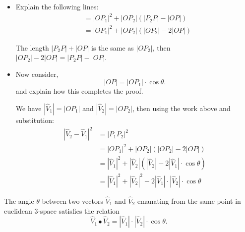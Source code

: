 \documentclass{ximera}
\begin{document}
\begin{problem}
\begin{itemize}
\item Explain the following lines:
\begin{align*}
&=|OP_{1}|^{2}+|OP_{2}| \left(|P_{2}P|-|OP|\right)\\
&=|OP_{1}|^{2}+|OP_{2}| \left(|OP_{2}| -2| OP| \right)
\end{align*}

\begin{freeResponse}
The length $|P_{2}P|+|OP|$ is the same as $|OP_{2}|$, then $|OP_{2}| - 2|OP| = |P_{2}P|-|OP|$.
\end{freeResponse}
\item Now consider,
\[
|OP| =|OP_{1}| \cdot\cos\theta.
\]
and explain how this completes the proof.

\begin{freeResponse}
We have $|\hat{V}_{1}| = |OP_{1}|$ and $|\hat{V}_{2}| = |OP_{2}|$, then using the work above and substitution:
\begin{align*} 
|\hat{V}_{2} - \hat{V}_{1}|^2 &= |P_{1}P_{2}|^{2}\\
&=|OP_{1}|^{2}+|OP_{2}| \left(|OP_{2}| -2| OP| \right)\\
&=|\hat{V}_{1}|^2 + |\hat{V}_{2}|\left(|\hat{V}_{2}| -2|\hat{V}_{1}| \cdot\cos\theta \right) \\
&=|\hat{V}_{1}|^2 + |\hat{V}_{2}|^2 -2|\hat{V}_{1}| \cdot |\hat{V}_{2}| \cdot\cos\theta
\end{align*}
\end{freeResponse}

\end{itemize}
\end{problem}




\begin{theorem}
\label{111}The angle $\theta$ between two vectors $\hat{V}_{1}$ and
$\hat{V}_{2}$ emanating from the same point in euclidean $3$-space satisfies
the relation
\begin{equation}
\hat{V}_{1}\bullet\hat{V}_{2}=\left\vert \hat{V}_{1}\right\vert \cdot
\left\vert \hat{V}_{2}\right\vert \cdot\cos\theta. \label{2}%
\end{equation}
\end{theorem}
\end{document}
